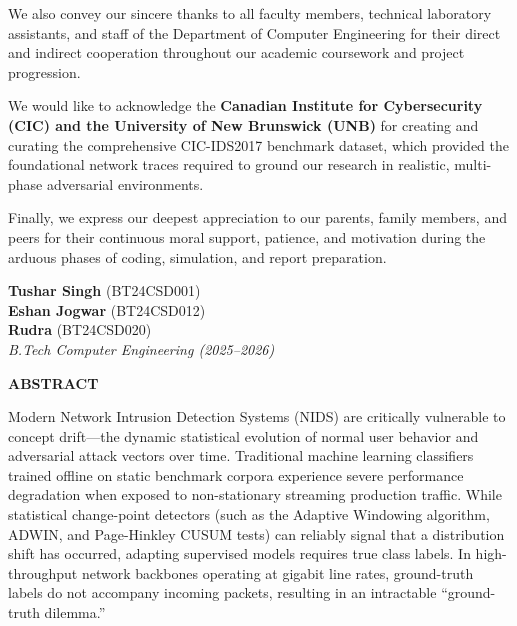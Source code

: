 \documentclass[12pt,a4paper,oneside]{report}
\begin{document}
\vspace{0.4cm}
\noindent We also convey our sincere thanks to all faculty members, technical laboratory assistants, and staff of the Department of Computer Engineering for their direct and indirect cooperation throughout our academic coursework and project progression.

\vspace{0.4cm}
\noindent We would like to acknowledge the \textbf{Canadian Institute for Cybersecurity (CIC) and the University of New Brunswick (UNB)} for creating and curating the comprehensive CIC-IDS2017 benchmark dataset, which provided the foundational network traces required to ground our research in realistic, multi-phase adversarial environments.

\vspace{0.4cm}
\noindent Finally, we express our deepest appreciation to our parents, family members, and peers for their continuous moral support, patience, and motivation during the arduous phases of coding, simulation, and report preparation.

\vspace{2.5cm}

\noindent
\begin{flushright}
\textbf{Tushar Singh} (BT24CSD001)\\
\textbf{Eshan Jogwar} (BT24CSD012)\\
\textbf{Rudra} (BT24CSD020)\\
\textit{B.Tech Computer Engineering (2025--2026)}
\end{flushright}

\newpage
\thispagestyle{plain}
\begin{center}
{\LARGE \textbf{ABSTRACT}}\\[1.0cm]
\end{center}

\noindent Modern Network Intrusion Detection Systems (NIDS) are critically vulnerable to concept drift---the dynamic statistical evolution of normal user behavior and adversarial attack vectors over time. Traditional machine learning classifiers trained offline on static benchmark corpora experience severe performance degradation when exposed to non-stationary streaming production traffic. While statistical change-point detectors (such as the Adaptive Windowing algorithm, ADWIN, and Page-Hinkley CUSUM tests) can reliably signal that a distribution shift has occurred, adapting supervised models requires true class labels. In high-throughput network backbones operating at gigabit line rates, ground-truth labels do not accompany incoming packets, resulting in an intractable ``ground-truth dilemma.''
\end{document}
